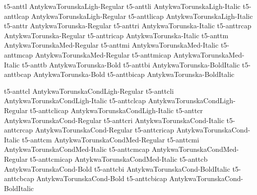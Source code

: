 \documentclass[test]{vnsample}
\begin{document}
\begin{shortsample}
      {t5-anttl}      {AntykwaTorunskaLigh-Regular}
     {t5-anttli}     {AntykwaTorunskaLigh-Italic}
     {t5-anttlcap}   {AntykwaTorunskaLigh-Regular}
   {t5-anttlicap}  {AntykwaTorunskaLigh-Italic}
      {t5-anttr}      {AntykwaTorunska-Regular}
     {t5-anttri}     {AntykwaTorunska-Italic}
     {t5-anttrcap}   {AntykwaTorunska-Regular}
   {t5-anttricap}  {AntykwaTorunska-Italic}
     {t5-anttm}      {AntykwaTorunskaMed-Regular}
    {t5-anttmi}     {AntykwaTorunskaMed-Italic}
    {t5-anttmcap}   {AntykwaTorunskaMed-Regular}
  {t5-anttmicap}  {AntykwaTorunskaMed-Italic}
      {t5-anttb}      {AntykwaTorunska-Bold}
     {t5-anttbi}     {AntykwaTorunska-BoldItalic}
     {t5-anttbcap}   {AntykwaTorunska-Bold}
   {t5-anttbicap}  {AntykwaTorunska-BoldItalic}
\end{shortsample}
\clearpage
\begin{shortsample}
     {t5-anttcl}     {AntykwaTorunskaCondLigh-Regular}
    {t5-anttcli}    {AntykwaTorunskaCondLigh-Italic}
    {t5-anttclcap}  {AntykwaTorunskaCondLigh-Regular}
  {t5-anttclicap} {AntykwaTorunskaCondLigh-Italic}
     {t5-anttcr}     {AntykwaTorunskaCond-Regular}
    {t5-anttcri}    {AntykwaTorunskaCond-Italic}
    {t5-anttcrcap}  {AntykwaTorunskaCond-Regular}
  {t5-anttcricap} {AntykwaTorunskaCond-Italic}
    {t5-anttcm}     {AntykwaTorunskaCondMed-Regular}
   {t5-anttcmi}    {AntykwaTorunskaCondMed-Italic}
   {t5-anttcmcap}  {AntykwaTorunskaCondMed-Regular}
 {t5-anttcmicap} {AntykwaTorunskaCondMed-Italic}
     {t5-anttcb}     {AntykwaTorunskaCond-Bold}
    {t5-anttcbi}    {AntykwaTorunskaCond-BoldItalic}
    {t5-anttcbcap}  {AntykwaTorunskaCond-Bold}
  {t5-anttcbicap} {AntykwaTorunskaCond-BoldItalic}
\end{shortsample}
\end{document}
